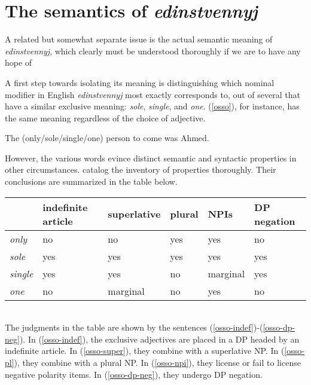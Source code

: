 \documentclass{article}
\begin{document}



\section{The semantics of \textit{edinstvennyj} \label{sec:which-edin}}
A related but somewhat separate issue is the actual semantic meaning of \textit{edinstvennyj}, which clearly must be understood thoroughly if we are to have any hope of

A first step towards isolating its meaning is distinguishing which nominal modifier in English \textit{edinstvennyj} most exactly corresponds to, out of several that have a similar exclusive meaning: \textit{sole}, \textit{single}, and \textit{one}. (\ref{osso}), for instance, has the same meaning regardless of the choice of adjective.

\begin{exe}
	\ex \label{osso} The (only/sole/single/one) person to come was Ahmed.
\end{exe}

However, the various words evince distinct semantic and syntactic properties in other circumstances. \citet{cb2012b} catalog the inventory of properties thoroughly. Their conclusions are summarized in the table below.\\

\begin{tabular}{ l | l l l l l }
	& indefinite article & superlative & plural & NPIs & DP negation \\
	\hline
	\textit{only} & no & no & yes & yes & no \\
	\textit{sole} & yes & yes & yes & yes & yes \\
	\textit{single} & yes & yes & no & marginal & yes \\
	\textit{one} & no & marginal & no & yes & no \\
\end{tabular}

\ \\

The judgments in the table are shown by the sentences (\ref{osso-indef})-(\ref{osso-dp-neg}). In (\ref{osso-indef}), the exclusive adjectives are placed in a DP headed by an indefinite article. In (\ref{osso-super}), they combine with a superlative NP. In (\ref{osso-pl}), they combine with a plural NP. In (\ref{osso-npi}), they license or fail to license negative polarity items. In (\ref{osso-dp-neg}), they undergo DP negation.
\end{document}
